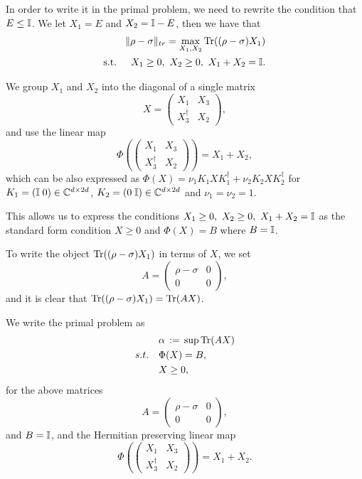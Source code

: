 \documentclass[12pt]{article}
\begin{document}
\begin{enumerate}
\begin{enumerate}
In order to write it in the primal problem, we need to rewrite the condition that $E \leq \mathbb{I}$. We let $X_1 = E$ and $X_2 = \mathbb{I} - E$, then we have that
\begin{align} \label{exercise3: eqn1}
\|\rho - \sigma\|_{tr}
  = \max_{X_1,X_2} \mathrm{Tr}((\rho - \sigma) X_1)\notag\\
\text{s.t. } \quad X_1 \ge 0,\ X_2 \ge 0,\ X_1 + X_2 = \mathbb{I}.
\end{align}

We group $X_1$ and $X_2$ into the diagonal of a single matrix 
\[
  X = \begin{pmatrix} X_1 & X_3 \\ X_3^\dagger & X_2 \end{pmatrix},
\]
and use the linear map 
\[\Phi\left(\begin{pmatrix} X_1 & X_3 \\ X_3^\dagger & X_2 \end{pmatrix}\right) = X_1 + X_2,\]
which can be also expressed as $\Phi(X) = \nu_1 K_1 X K_1^\dagger + \nu_2 K_2 X K_2^\dagger$ for $K_1 = (\mathbb{I} \; 0) \in \mathbb{C}^{d \times 2d}$, $K_2 = (0 \; \mathbb{I}) \in \mathbb{C}^{d \times 2d}$ and $\nu_1 = \nu_2 = 1$.

This allows us to express the conditions $X_1 \ge 0,\ X_2 \ge 0,\ X_1 + X_2 = \mathbb{I}$ as the standard form condition $X \ge 0$ and $\Phi(X) = B$ where $B = \mathbb{I}$.

To write the object $\mathrm{Tr}((\rho - \sigma) X_1)$ in terms of $X$, we set 
\[
  A = \begin{pmatrix} \rho - \sigma & 0 \\ 0 & 0 \end{pmatrix},
\]
and it is clear that $\mathrm{Tr}((\rho - \sigma) X_1) = \mathrm{Tr}(AX)$.

We write the primal problem as 
\begin{align}
&\alpha\,:=\,  \sup \mathrm{Tr}(AX)\notag \\
s.t.\quad& \Phi(X)=B,\notag \\
& X \geq 0,\notag
\end{align}
for the above matrices
\[
  A = \begin{pmatrix} \rho - \sigma & 0 \\ 0 & 0 \end{pmatrix},
\]
and $B = \mathbb{I}$, and the Hermitian preserving linear map
\[\Phi\left(\begin{pmatrix} X_1 & X_3 \\ X_3^\dagger & X_2 \end{pmatrix}\right) = X_1 + X_2.\]


\end{enumerate}
\end{enumerate}
\end{document}
